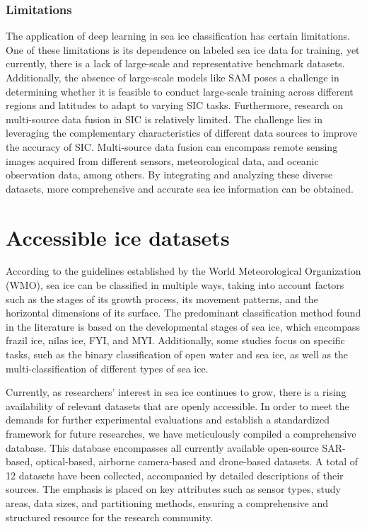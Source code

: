 \subsubsection {Limitations}
The application of deep learning in sea ice classification has certain limitations. One of these limitations is its dependence on labeled sea ice data for training, yet currently, there is a lack of large-scale and representative benchmark datasets. Additionally, the absence of large-scale models like SAM poses a challenge in determining whether it is feasible to conduct large-scale training across different regions and latitudes to adapt to varying SIC tasks. Furthermore, research on multi-source data fusion in SIC is relatively limited. The challenge lies in leveraging the complementary characteristics of different data sources to improve the accuracy of SIC. Multi-source data fusion can encompass remote sensing images acquired from different sensors, meteorological data, and oceanic observation data, among others. By integrating and analyzing these diverse datasets, more comprehensive and accurate sea ice information can be obtained.

\section{Accessible ice datasets}
\label{section:C}

According to the guidelines established by the World Meteorological Organization (WMO), sea ice can be classified in multiple ways, taking into account factors such as the stages of its growth process, its movement patterns, and the horizontal dimensions of its surface. The predominant classification method found in the literature is based on the developmental stages of sea ice, which encompass frazil ice, nilas ice, FYI, and MYI. Additionally, some studies focus on specific tasks, such as the binary classification of open water and sea ice, as well as the multi-classification of different types of sea ice.

Currently, as researchers' interest in sea ice continues to grow, there is a rising availability of relevant datasets that are openly accessible. In order to meet the demands for further experimental evaluations and establish a standardized framework for future researches, we have meticulously compiled a comprehensive database. This database encompasses all currently available open-source SAR-based, optical-based, airborne camera-based and drone-based datasets. A total of 12 datasets have been collected, accompanied by detailed descriptions of their sources. The emphasis is placed on key attributes such as sensor types, study areas, data sizes, and partitioning methods, ensuring a comprehensive and structured resource for the research community.

